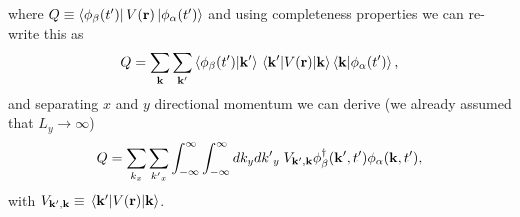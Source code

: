 where $Q \equiv \bra{\phi_{\beta}(t')}
V(\vb{r}) \ket{\phi_{\alpha}(t')}$ and using completeness properties we can re-write this as
\begin{equation} \label{eq_c18}
    Q =
    \sum_{\vb{k}}\sum_{\vb{k'}}
    \braket{\phi_{\beta}(t')}{\vb{k'}}
    \mel{\vb{k'}}{V(\vb{r})}{\vb{k}}
    \braket{\vb{k}}{\phi_{\alpha}(t')},
\end{equation}
and separating $x$ and $y$ directional momentum we can derive (we already assumed that $L_y \rightarrow \infty$)
\begin{equation} \label{eq_c19}
    Q =
    \sum_{k_x}\sum_{{k'}_x}
    \int_{-\infty}^{\infty} \int_{-\infty}^{\infty} dk_y d{k'}_y \;
    V_{\vb{k'},\vb{k}}
    \phi_{\beta}^{\dagger}(\vb{k'},t')
    \phi_{\alpha}(\vb{k},t'),
\end{equation}
with $V_{\vb{k'},\vb{k}} \equiv \mel{\vb{k'}}{V(\vb{r})}{\vb{k}}$.

